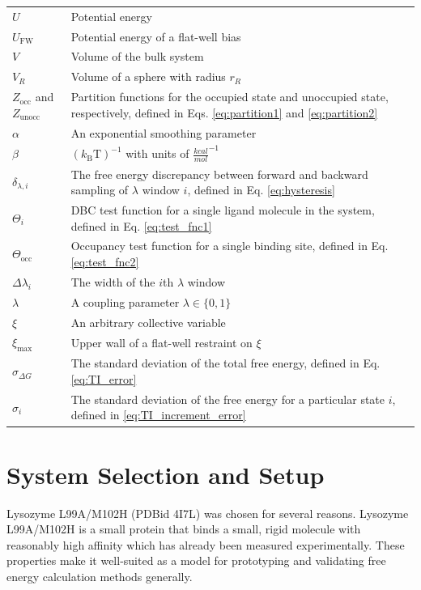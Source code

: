 \documentclass[9pt,tutorial]{Styling/livecoms}
\begin{document}
\begin{table}[H]
{\begin{tabular}{  p{.25\linewidth} | p{.75\linewidth}  }
        $U$ & Potential energy\\
        $U_\mathrm{FW}$ & Potential energy of a flat-well bias\\
        $V$ & Volume of the bulk system\\
        $V_R$ & Volume of a sphere with radius $r_R$\\
        $Z_\mathrm{occ}$ and $Z_\mathrm{unocc}$ & Partition functions for the occupied state and unoccupied state, respectively, defined in Eqs. \ref{eq:partition1} and \ref{eq:partition2}\\
        $\alpha$ & An exponential smoothing parameter\\
        $\beta$ & $(k_\mathrm{B}\mathrm{T})^{-1}$ with units of $\frac{kcal}{mol}^{-1}$\\
        $\delta_{\lambda,i}$ & The free energy discrepancy between forward and backward sampling of $\lambda$ window $i$, defined in Eq. \ref{eq:hysteresis}\\
        $\Theta_i$ & DBC test function for a single ligand molecule in the system, defined in Eq. \ref{eq:test_fnc1}\\
        $\Theta_\mathrm{occ}$ & Occupancy test function for a single binding site, defined in Eq. \ref{eq:test_fnc2}\\
        $\Delta \lambda_i$ & The width of the $i$th $\lambda$ window\\
        $\lambda$ & A coupling parameter $\lambda\in\{0,1\}$\\
        $\xi$ & An arbitrary collective variable\\
        $\xi_\mathrm{max}$ & Upper wall of a flat-well restraint on $\xi$\\
        $\sigma_{\Delta G}$ & The standard deviation of the total free energy, defined in Eq. \ref{eq:TI_error}\\
        $\sigma_i$ & The standard deviation of the free energy for a particular state $i$, defined in \ref{eq:TI_increment_error}\\
        \hline
    \end{tabular}}
\end{table}

    

\setcounter{section}{0}
\renewcommand\thesection{Appendix~\Alph{section}}
\renewcommand\thesubsection{\thesection.\arabic{subsection}}

\section{System Selection and Setup}
\label{app:motivation}
Lysozyme L99A/M102H (PDBid 4I7L) was chosen for several reasons. Lysozyme L99A/M102H is a small protein that binds a small, rigid molecule with reasonably high affinity which has already been measured experimentally. These properties make it well-suited as a model for prototyping and validating free energy calculation methods generally. 
\end{document}

